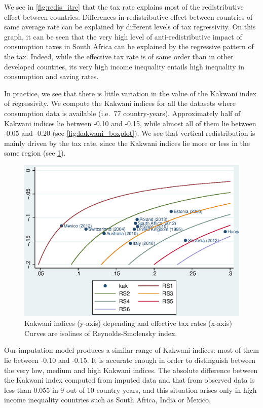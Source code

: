 \documentclass[12pt]{article}
\begin{document}
We see in \cref{fig:redis_itrc} that the tax rate explains most of the redistributive effect between countries. Differences in redistributive effect between countries of same average rate can be explained by different levels of tax regressivity. On this graph, it can be seen that the very high level of anti-redistributive impact of consumption taxes in South Africa can be explained by the regressive pattern of the tax. Indeed, while the effective tax rate is of same order than in other developed countries, its very high income inequality entails high inequality in consumption and saving rates.

In practice, we see that there is little variation in the value of the Kakwani index of regressivity. We compute the Kakwani indices for all the datasets where consumption data is available (i.e.\ 77 country-years). Approximately half of Kakwani indices lie between -0.10 and -0.15, while almost all of them lie between -0.05 and -0.20 (see \cref{fig:kakwani_boxplot}). We see that vertical redistribution is mainly driven by the tax rate, since the Kakwani indices lie more or less in the same region (see \cref{fig:RS_isolines}).

\begin{figure}[h]
    \centering
    \includegraphics{images/19-01-11_RS_isolines_obs_mod1}
    \caption{Kakwani indices (y-axis) depending and effective tax rates (x-axis) \\ 
    Curves are isolines of Reynolds-Smolensky index.}
    \label{fig:RS_isolines}
\end{figure}

Our imputation model produces a similar range of Kakwani indices: most of them lie between -0.10 and -0.15. It is accurate enough in order to distinguish between the very low, medium and high Kakwani indices. The absolute difference between the Kakwani index computed from imputed data and that from observed data is less than 0.055 in 9 out of 10 country-years, and this situation arises only in high income inequality countries such as South Africa, India or Mexico.
\end{document}
